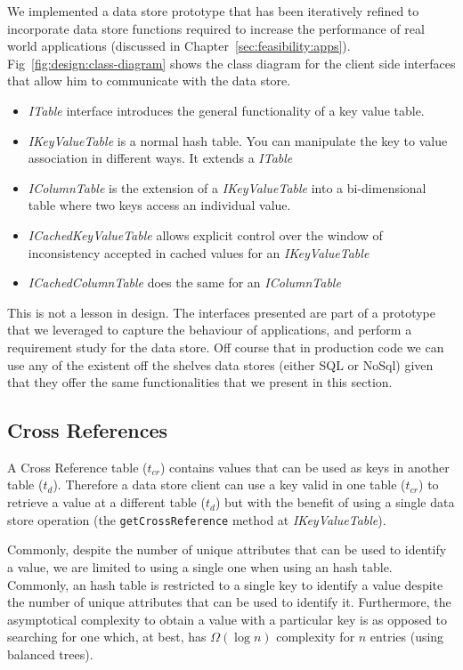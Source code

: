 We implemented a  data store prototype that has been iteratively refined to incorporate data store functions required to increase the performance of real world applications (discussed in Chapter~\ref{sec:feasibility:apps}).  
Fig~\ref{fig:design:class-diagram} shows the class diagram for the client side interfaces that allow him to communicate with the  data store.  
\begin{itemize}
\item \emph{ITable} interface introduces the general functionality of a key value table.
\item \emph{IKeyValueTable}  is a normal hash table. You can manipulate the key to value association in different ways. It extends a \emph{ITable}
\item \emph{IColumnTable} is the extension of a \emph{IKeyValueTable} into a bi-dimensional table where two keys access an individual value. 
\item \emph{ICachedKeyValueTable} allows explicit control over the window of inconsistency accepted in cached values for an \emph{IKeyValueTable} 
\item \emph{ICachedColumnTable} does the same for an \emph{IColumnTable} 
\end{itemize}

This is not a lesson in design. The interfaces presented are part of a prototype that we leveraged to capture the behaviour of applications, and perform a requirement study for the data store. Off course that in production code we can use any of the existent off the shelves data stores (either SQL or NoSql) given that they offer the same functionalities that we present in this section. 
\label{sec:heimdall:key-value}

\subsection{Cross References} 
\label{sec:heimdall:cross-references}
A Cross Reference table ($t_{cr}$) contains values that can be used as keys in another table ($t_{d}$). 
Therefore a data store client can use a key valid in  one table ($t_{cr}$) to retrieve a value at  a different table ($t_{d}$) but with the benefit of using a  single data store operation (the \texttt{getCrossReference} method at \emph{IKeyValueTable}). 

Commonly, despite the number of unique attributes that can be used to identify a value, we are limited to using a single one when using an hash table. 
Commonly, an hash table is restricted to a single key to identify a value despite the  number of unique attributes  that can be used to identify it. 
Furthermore, the asymptotical complexity to obtain a value with a particular key is  as opposed to searching for one which, at best, has $\Omega(\log n)$ complexity for $n$ entries (using balanced trees). 

